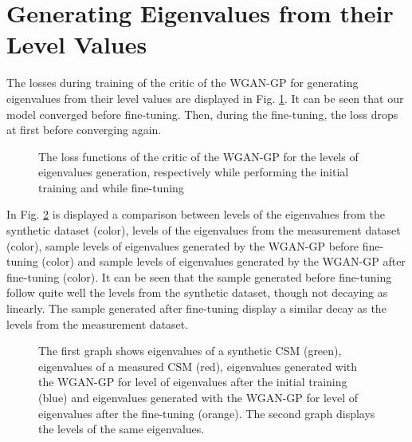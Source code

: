 \documentclass[11pt,a4paper,twoside]{report}
\begin{document}
\section{Generating Eigenvalues from their Level Values}

The losses during training of the critic of the WGAN-GP for generating eigenvalues from their level values are displayed in Fig. \ref{fig:loss_evals_dB_wgangp}. It can be seen that our model converged before fine-tuning. Then, during the fine-tuning, the loss drops at first before converging again.

\begin{figure}
    \centering
    \caption{The loss functions of the critic of the WGAN-GP for the levels of eigenvalues generation, respectively while performing the initial training and while fine-tuning}
    \label{fig:loss_evals_dB_wgangp}
\end{figure}


In Fig. \ref{fig:samples_evals_dB_wgangp} is displayed a comparison between levels of the eigenvalues from the synthetic dataset (color), levels of the eigenvalues from the measurement dataset (color), sample levels of eigenvalues generated by the WGAN-GP before fine-tuning (color) and sample levels of eigenvalues generated by the WGAN-GP after fine-tuning (color). It can be seen that the sample generated before fine-tuning follow quite well the levels from the synthetic dataset, though not decaying as linearly. The sample generated after fine-tuning display a similar decay as the levels from the measurement dataset.

\begin{figure}
    \centering
    \caption{The first graph shows eigenvalues of a synthetic CSM (green), eigenvalues of a measured CSM (red), eigenvalues generated with the WGAN-GP for level of eigenvalues after the initial training (blue) and eigenvalues generated with the WGAN-GP for level of eigenvalues after the fine-tuning (orange). The second graph displays the levels of the same eigenvalues.}
    \label{fig:samples_evals_dB_wgangp}
\end{figure}
\end{document}
